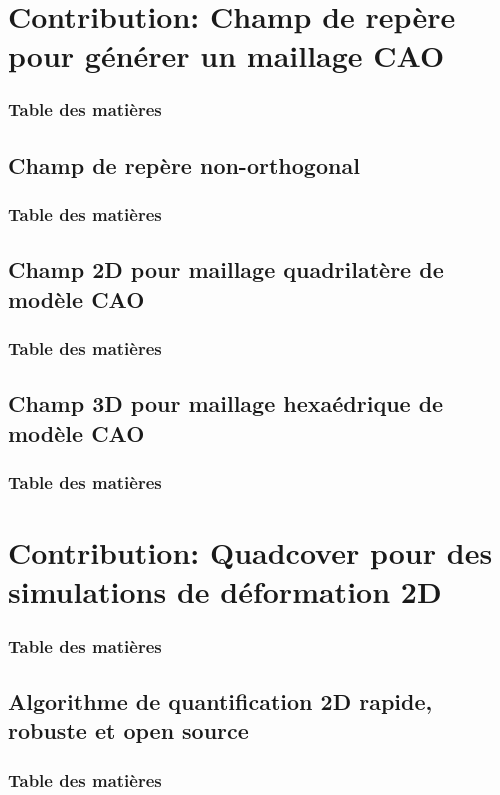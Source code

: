 \documentclass{beamer}
\begin{document}
\section{Contribution: Champ de repère pour générer un maillage CAO }
\begin{frame}
    \frametitle{Table des matières}
    \tableofcontents[currentsection, sectionstyle=show/shaded, subsectionstyle=show/show/hide]
\end{frame}

\subsection{Champ de repère non-orthogonal}
\begin{frame}
    \frametitle{Table des matières}
    \tableofcontents[currentsubsection, sectionstyle=show/shaded, subsectionstyle=show/shaded/hide]
\end{frame}


\subsection{Champ 2D pour maillage quadrilatère de modèle CAO}
\begin{frame}
    \frametitle{Table des matières}
    \tableofcontents[currentsubsection, sectionstyle=show/shaded, subsectionstyle=show/shaded/hide]
\end{frame}


\subsection{Champ 3D pour maillage hexaédrique de modèle CAO}
\begin{frame}
    \frametitle{Table des matières}
    \tableofcontents[currentsubsection, sectionstyle=show/shaded, subsectionstyle=show/shaded/hide]
\end{frame}



\section{Contribution: Quadcover pour des simulations de déformation 2D}
\begin{frame}
    \frametitle{Table des matières}
    \tableofcontents[currentsection, sectionstyle=show/shaded, subsectionstyle=show/show/hide]
\end{frame}
\subsection{Algorithme de quantification 2D rapide, robuste et open source}
\begin{frame}
    \frametitle{Table des matières}
    \tableofcontents[currentsubsection, sectionstyle=show/shaded, subsectionstyle=show/shaded/hide]
\end{frame}

\end{document}
